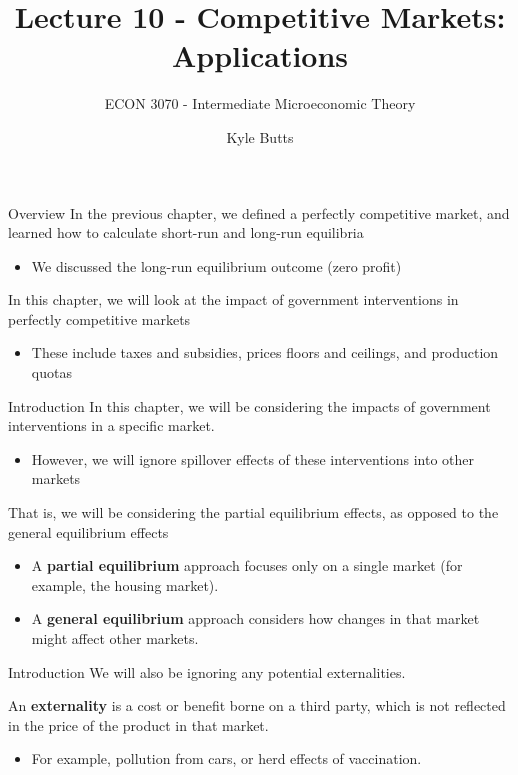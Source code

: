 \documentclass[11pt,t]{beamer}
\author{Kyle Butts}
\title{Lecture 10 - Competitive Markets: Applications}
\subtitle{ECON 3070 - Intermediate Microeconomic Theory}
\begin{document}
\begin{frame}
  \titlepage
\end{frame}

\begin{frame}{Overview}
  In the previous chapter, we defined a perfectly competitive market, and learned how to calculate short-run and long-run equilibria

  \begin{itemize}
    \item We discussed the long-run equilibrium outcome (zero profit)
  \end{itemize}

  In this chapter, we will look at the impact of government interventions in perfectly competitive markets

  \begin{itemize}
    \item These include taxes and subsidies, prices floors and ceilings, and production quotas
  \end{itemize}
\end{frame}

\begin{frame}{Introduction}
  In this chapter, we will be considering the impacts of government interventions in a specific market.

  \begin{itemize}
    \item However, we will ignore spillover effects of these interventions into other markets
  \end{itemize}

  \bigskip
  That is, we will be considering the partial equilibrium effects, as opposed to the general equilibrium effects

  \begin{itemize}
    \item A \textbf{partial equilibrium} approach focuses only on a single market (for example, the housing market).
    \item A \textbf{general equilibrium} approach considers how changes in that market might affect other markets.
  \end{itemize}  

\end{frame}

\begin{frame}{Introduction}
  We will also be ignoring any potential externalities.

  \bigskip
  An \textbf{externality} is a cost or benefit borne on a third party, which is not reflected in the price of the product in that market.
  
  \begin{itemize}
    \item For example, pollution from cars, or herd effects of vaccination.
  \end{itemize}
\end{frame}
\end{document}
